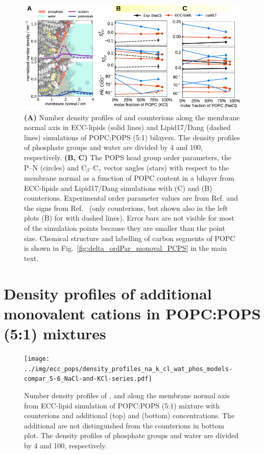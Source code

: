 \documentclass[journal=jctcce,manuscript=article]{achemso}
\newlength{\figwidth}
\newlength{\figwidthfull}
\begin{document}
\begin{figure}[!h] 
  \centering 
  \includegraphics[width=\figwidthfull]{../img/deltaOP_mix_PC-PS_SupplInf-POPS-OP.pdf} 
  \caption{\label{fig:delta_ordPar_NaCl_PC-PS_mix_PS} 
    \textbf{(A)} Number density profiles of  and  counterions along the membrane normal axis
    in ECC-lipids (solid lines) and Lipid17/Dang (dashed lines) simulations of POPC:POPS (5:1) bilayers.  
    The density profiles of phosphate groups and water are divided by 4 and 100, respectively.  
    \textbf{(B, C)} The POPS head group order parameters, the P--N (circles) and C$_\beta$--C$_\gamma$ vector angles (stars) 
    with respect to the membrane normal as a function of POPC content in a bilayer
    from ECC-lipids and Lipid17/Dang simulations with  (C) and  (B) counterions.
    Experimental order parameter values are from Ref. 
    and the signs from Ref.~ 
    (only  counterions, but shown also in the left plots (B) for  with dashed lines).
    Error bars are not visible for most of the simulation points because they are smaller than the point size.
    Chemical structure and labelling of carbon segments of POPC is shown in Fig.~\ref{fig:delta_ordPar_monoval_PCPS} in the main text. 
  }
\end{figure} 



\pagebreak

\section{Density profiles of additional monovalent cations in POPC:POPS (5:1) mixtures}

\begin{figure}[!h] 
  \centering 
  \texttt{[image: ../img/ecc\_pops/density\_profiles\_na\_k\_cl\_wat\_phos\_models-compar\_5-6\_NaCl-and-KCl-series.pdf]}
  \caption{\label{fig:nacl-dens_PCPS} 
    Number density profiles of ,  and  along the membrane normal axis
    from ECC-lipid simulation of POPC:POPS (5:1) mixture with  counterions and
    additional  (top) and  (bottom) concentrations.
    The additional  are not distinguished from the counterions in bottom plot.
    The density profiles of phosphate groups and water are divided by 4 and 100, respectively.  
  }
\end{figure} 
\end{document}

